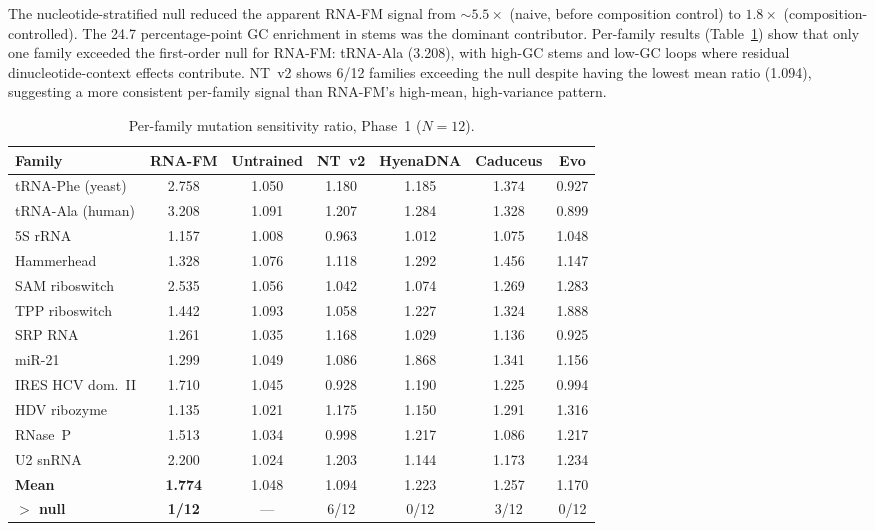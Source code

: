 \documentclass[11pt]{article}
\begin{document}
The nucleotide-stratified null reduced the apparent RNA-FM signal from
${\sim}5.5\times$ (naive, before composition control) to $1.8\times$
(composition-controlled).  The 24.7 percentage-point GC enrichment in
stems was the dominant contributor.  Per-family results
(Table~\ref{tab:per_family_phase1}) show that only one family
exceeded the first-order null for RNA-FM: tRNA-Ala (3.208), with
high-GC stems and low-GC loops where residual dinucleotide-context
effects contribute.  NT~v2 shows 6/12 families exceeding the null
despite having the lowest mean ratio (1.094), suggesting a more
consistent per-family signal than RNA-FM's high-mean, high-variance
pattern.

\begin{table}[t]
\centering
\caption{Per-family mutation sensitivity ratio, Phase~1 ($N = 12$).}
\label{tab:per_family_phase1}
\small
\begin{tabular}{@{}lcccccc@{}}
\toprule
\textbf{Family} & \textbf{RNA-FM} & \textbf{Untrained} &
  \textbf{NT~v2} & \textbf{HyenaDNA} & \textbf{Caduceus} &
  \textbf{Evo} \\
\midrule
tRNA-Phe (yeast)  & 2.758 & 1.050 & 1.180 & 1.185 & 1.374 & 0.927 \\
tRNA-Ala (human)  & 3.208 & 1.091 & 1.207 & 1.284 & 1.328 & 0.899 \\
5S rRNA           & 1.157 & 1.008 & 0.963 & 1.012 & 1.075 & 1.048 \\
Hammerhead        & 1.328 & 1.076 & 1.118 & 1.292 & 1.456 & 1.147 \\
SAM riboswitch    & 2.535 & 1.056 & 1.042 & 1.074 & 1.269 & 1.283 \\
TPP riboswitch    & 1.442 & 1.093 & 1.058 & 1.227 & 1.324 & 1.888 \\
SRP RNA           & 1.261 & 1.035 & 1.168 & 1.029 & 1.136 & 0.925 \\
miR-21            & 1.299 & 1.049 & 1.086 & 1.868 & 1.341 & 1.156 \\
IRES HCV dom.~II  & 1.710 & 1.045 & 0.928 & 1.190 & 1.225 & 0.994 \\
HDV ribozyme      & 1.135 & 1.021 & 1.175 & 1.150 & 1.291 & 1.316 \\
RNase~P           & 1.513 & 1.034 & 0.998 & 1.217 & 1.086 & 1.217 \\
U2 snRNA          & 2.200 & 1.024 & 1.203 & 1.144 & 1.173 & 1.234 \\
\midrule
\textbf{Mean}     & \textbf{1.774} & 1.048 & 1.094 & 1.223 & 1.257
                  & 1.170 \\
\textbf{$>$ null} & \textbf{1/12} & --- & 6/12 & 0/12 & 3/12 & 0/12 \\
\bottomrule
\end{tabular}
\end{table}
\end{document}
